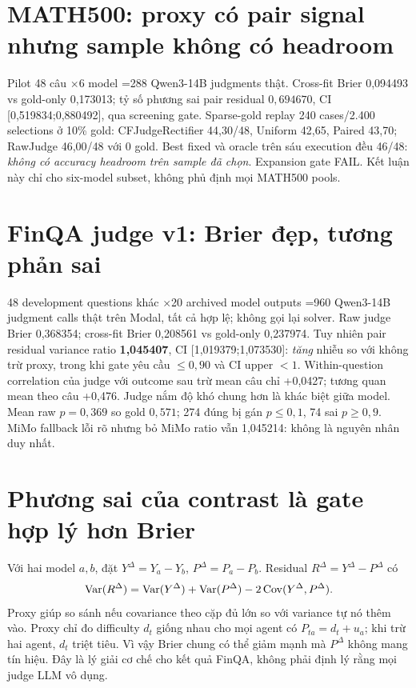 \documentclass[11pt,a4paper,openany]{book}
\begin{document}
\section{MATH500: proxy có pair signal nhưng sample không có headroom}
Pilot 48 câu \(\times\)6 model =288 Qwen3-14B judgments thật. Cross-fit Brier 0,094493 vs gold-only 0,173013; tỷ số phương sai pair residual \(0,694670\), CI [0,519834;0,880492], qua screening gate. Sparse-gold replay 240 cases/2.400 selections ở 10\% gold: CFJudgeRectifier 44,30/48, Uniform 42,65, Paired 43,70; RawJudge 46,00/48 với 0 gold. Best fixed và oracle trên sáu execution đều 46/48: \emph{không có accuracy headroom trên sample đã chọn}. Expansion gate FAIL. Kết luận này chỉ cho six-model subset, không phủ định mọi MATH500 pools.

\section{FinQA judge v1: Brier đẹp, tương phản sai}\label{sec:finqajudge}
48 development questions khác \(\times\)20 archived model outputs =960 Qwen3-14B judgment calls thật trên Modal, tất cả hợp lệ; không gọi lại solver. Raw judge Brier 0,368354; cross-fit Brier 0,208561 vs gold-only 0,237974. Tuy nhiên pair residual variance ratio \textbf{1,045407}, CI [1,019379;1,073530]: \emph{tăng} nhiễu so với không trừ proxy, trong khi gate yêu cầu \(\le0,90\) và CI upper \(<1\). Within-question correlation của judge với outcome sau trừ mean câu chỉ +0,0427; tương quan mean theo câu +0,476. Judge nắm độ khó chung hơn là khác biệt giữa model. Mean raw \(p=0,369\) so gold \(0,571\); 274 đúng bị gán \(p\le0,1\), 74 sai \(p\ge0,9\). MiMo fallback lỗi rõ nhưng bỏ MiMo ratio vẫn 1,045214: không là nguyên nhân duy nhất.

\section{Phương sai của contrast là gate hợp lý hơn Brier}\label{sec:contrast}
Với hai model \(a,b\), đặt \(Y^\Delta=Y_a-Y_b\), \(P^\Delta=P_a-P_b\). Residual \(R^\Delta=Y^\Delta-P^\Delta\) có
\begin{equation}\label{eq:variance}\operatorname{Var}(R^\Delta)=\operatorname{Var}(Y^\Delta)+\operatorname{Var}(P^\Delta)-2\operatorname{Cov}(Y^\Delta,P^\Delta).
\end{equation}
Proxy giúp so sánh nếu covariance theo cặp đủ lớn so với variance tự nó thêm vào. Proxy chỉ đo difficulty \(d_t\) giống nhau cho mọi agent có \(P_{ta}=d_t+u_a\); khi trừ hai agent, \(d_t\) triệt tiêu. Vì vậy Brier chung có thể giảm mạnh mà \(P^\Delta\) không mang tín hiệu. Đây là lý giải cơ chế cho kết quả FinQA, không phải định lý rằng mọi judge LLM vô dụng.
\end{document}
